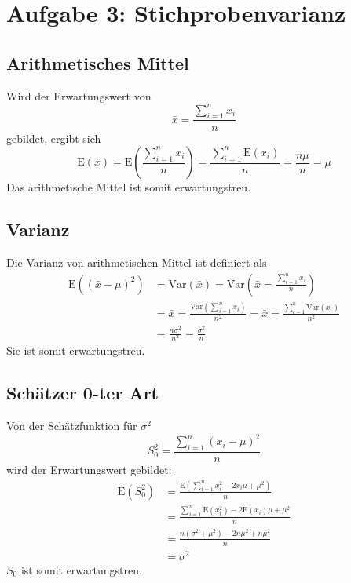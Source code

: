 \section*{Aufgabe 3: Stichprobenvarianz}
\label{sec:Aufgabe3}

\subsection*{Arithmetisches Mittel}
\label{sub:Arithmetisches Mittel}
Wird der Erwartungswert von
\begin{equation}
    \bar{x}=\frac{\sum_{i=1}^nx_i}{n}
\end{equation}
gebildet, ergibt sich
\begin{equation}
    \text{E}(\bar{x})=\text{E}\left(\frac{\sum_{i=1}^nx_i}{n}\right)=\frac{\sum_{i=1}^n\text{E}(x_i)}{n}=\frac{n\mu}{n}=\mu
\end{equation}
Das arithmetische Mittel ist somit erwartungstreu.

\subsection*{Varianz}
\label{sub:Varianz}
Die Varianz von arithmetischen Mittel ist definiert als
\begin{align}
    \text{E}\left((\bar{x}-\mu)^2 \right)&=\text{Var}(\bar{x})=\text{Var}\left(\bar{x}=\frac{\sum_{i=1}^nx_i}{n}\right)\\
    &=\bar{x}=\frac{\text{Var}\left(\sum_{i=1}^nx_i\right)}{n^2}=\bar{x}=\frac{\sum_{i=1}^n\text{Var}(x_i)}{n^2}\\
    &=\frac{n\sigma^2}{n^2}=\frac{\sigma^2}{n}
\end{align}
Sie ist somit erwartungstreu.

\subsection*{Schätzer 0-ter Art}
\label{sub:Schätzer 0-ter Art}
Von der Schätzfunktion für $\sigma^2$
\begin{equation}
    S_0^2=\frac{\sum_{i=1}^n(x_i-\mu)^2}{n}
\end{equation}
wird der Erwartungswert gebildet:
\begin{align}
    \text{E}(S_0^2)&=\frac{\text{E}\left(\sum_{i=1}^nx_i^2-2x_i\mu +\mu^2\right)}{n}\\
    &=\frac{\sum_{i=1}^n\text{E}(x_i^2)-2\text{E}(x_i)\mu +\mu^2}{n}\\
    &=\frac{n(\sigma^2+\mu^2)-2n\mu^2 +n\mu^2}{n}\\
    &=\sigma^2
\end{align}
$S_0$ ist somit erwartungstreu.